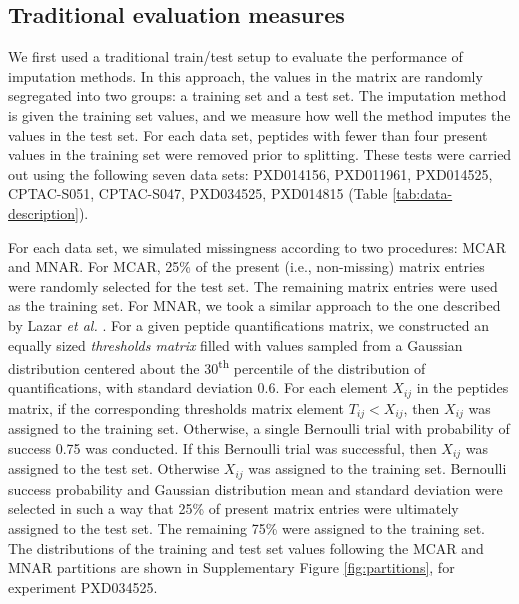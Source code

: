 \documentclass{article}
\begin{document}
\subsection{Traditional evaluation measures}

We first used a traditional train/test setup to evaluate the performance of imputation methods. In this approach, the values in the matrix are randomly segregated into two groups: a training set and a test set.  The imputation method is given the training set values, and we measure how well the method imputes the values in the test set.  For each data set, peptides with fewer than four present values in the training set were removed prior to splitting.  These tests were carried out using the following seven data sets: PXD014156, PXD011961, PXD014525, CPTAC-S051, CPTAC-S047, PXD034525, PXD014815 (Table \ref{tab:data-description}).

For each data set, we simulated missingness according to two procedures: MCAR and MNAR. For MCAR, 25\% of the present (i.e., non-missing) matrix entries were randomly selected for the test set. The remaining matrix entries were used as the training set.  For MNAR, we took a similar approach to the one described by Lazar \textit{et al.} \cite{lazar}. For a given peptide quantifications matrix, we constructed an equally sized \textit{thresholds matrix} filled with values sampled from a Gaussian distribution centered about the 30\textsuperscript{th} percentile of the distribution of quantifications, with standard deviation 0.6. For each element $X_{ij}$ in the peptides matrix, if the corresponding thresholds matrix element $T_{ij} < X_{ij}$, then $X_{ij}$ was assigned to the training set. Otherwise, a single Bernoulli trial with probability of success 0.75 was conducted.  If this Bernoulli trial was successful, then $X_{ij}$ was assigned to the test set. Otherwise $X_{ij}$ was assigned to the training set. Bernoulli success probability and Gaussian distribution mean and standard deviation were selected in such a way that 25\% of present matrix entries were ultimately assigned to the test set. The remaining 75\% were assigned to the training set. The distributions of the training and test set values following the MCAR and MNAR partitions are shown in Supplementary Figure \ref{fig:partitions}, for experiment PXD034525.
\end{document}
